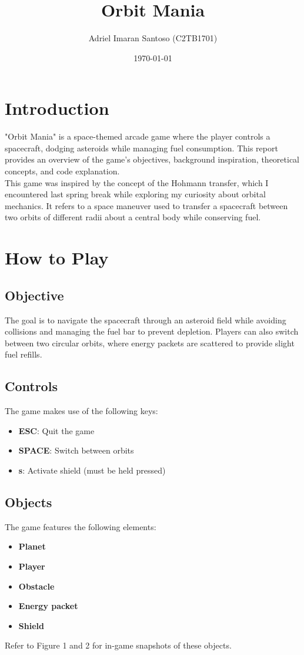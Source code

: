 \documentclass[11pt, a4paper]{article}
\title{Orbit Mania}
\author{Adriel Imaran Santoso (C2TB1701)}
\date{\today}
\begin{document}
\maketitle

\section{Introduction}
"Orbit Mania" is a space-themed arcade game where the player controls a spacecraft, dodging asteroids while managing fuel consumption. This report provides an overview of the game's objectives, background inspiration, theoretical concepts, and code explanation.\\[6pt]
This game was inspired by the concept of the Hohmann transfer, which I encountered last spring break while exploring my curiosity about orbital mechanics. It refers to a space maneuver used to transfer a spacecraft between two orbits of different radii about a central body while conserving fuel.

\section{How to Play}
\subsection{Objective}
The goal is to navigate the spacecraft through an asteroid field while avoiding collisions and managing the fuel bar to prevent depletion. Players can also switch between two circular orbits, where energy packets are scattered to provide slight fuel refills.

\subsection{Controls}
The game makes use of the following keys:
\begin{itemize}
\item \textbf{ESC}: Quit the game
\item \textbf{SPACE}: Switch between orbits
\item \textbf{s}: Activate shield (must be held pressed)
\end{itemize}

\subsection{Objects}
The game features the following elements:
\begin{itemize}
\item \textbf{Planet}
\item \textbf{Player}
\item \textbf{Obstacle}
\item \textbf{Energy packet}
\item \textbf{Shield}
\end{itemize}
Refer to Figure 1 and 2 for in-game snapshots of these objects.
\end{document}
